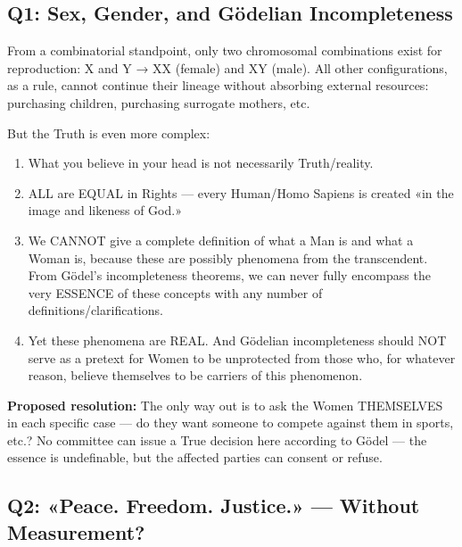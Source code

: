 \documentclass[11pt,a4paper]{article}
\theoremstyle{definition}
\theoremstyle{remark}
\begin{document}
\vspace{1em}

\subsection{Q1: Sex, Gender, and Gödelian Incompleteness}

From a combinatorial standpoint, only two chromosomal combinations exist for reproduction: X and Y → XX (female) and XY (male). All other configurations, as a rule, cannot continue their lineage without absorbing external resources: purchasing children, purchasing surrogate mothers, etc.

But the Truth is even more complex:

\begin{enumerate}[label=\alph*)]
\item What you believe in your head is not necessarily Truth/reality.

\item ALL are EQUAL in Rights — every Human/Homo Sapiens is created «in the image and likeness of God.»

\item We CANNOT give a complete definition of what a Man is and what a Woman is, because these are possibly phenomena from the transcendent. From Gödel's incompleteness theorems, we can never fully encompass the very ESSENCE of these concepts with any number of definitions/clarifications.

\item Yet these phenomena are REAL. And Gödelian incompleteness should NOT serve as a pretext for Women to be unprotected from those who, for whatever reason, believe themselves to be carriers of this phenomenon.
\end{enumerate}

\textbf{Proposed resolution:} The only way out is to ask the Women THEMSELVES in each specific case — do they want someone to compete against them in sports, etc.? No committee can issue a True decision here according to Gödel — the essence is undefinable, but the affected parties can consent or refuse.

\subsection{Q2: «Peace. Freedom. Justice.» — Without Measurement?}
\end{document}
